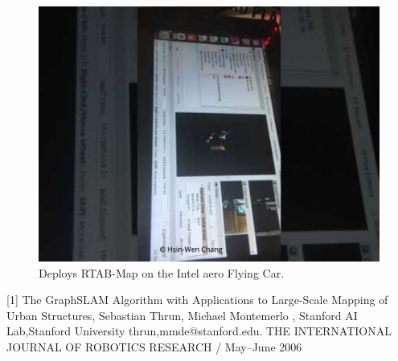 \documentclass[10pt,journal,compsoc]{IEEEtran}
\begin{document}
\begin{figure}[thpb]
      \centering
      \includegraphics[width=\linewidth]{RTAB-Map.jpeg}
      \caption{Deploys RTAB-Map on the Intel aero Flying Car.}
      \label{fig:robot1}
\end{figure}



[1] The GraphSLAM Algorithm with Applications to Large-Scale Mapping of Urban Structures, Sebastian Thrun, Michael Montemerlo
, Stanford AI Lab,Stanford University {thrun,mmde}@stanford.edu. THE INTERNATIONAL JOURNAL OF ROBOTICS RESEARCH / May–June 2006
\end{document}
